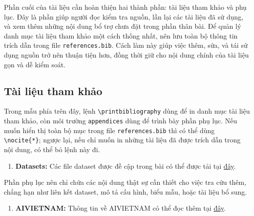\documentclass[12pt]{eDA_conquer2026}
\begin{document}
Phần cuối của tài liệu cần hoàn thiện hai thành phần: tài liệu tham khảo và phụ lục. Đây là phần giúp người đọc kiểm tra nguồn, lần lại các tài liệu đã sử dụng, và xem thêm những nội dung bổ trợ chưa đặt trong phần thân bài. Để quản lý danh mục tài liệu tham khảo một cách thống nhất, nên lưu toàn bộ thông tin trích dẫn trong file \texttt{references.bib}. Cách làm này giúp việc thêm, sửa, và tái sử dụng nguồn trở nên thuận tiện hơn, đồng thời giữ cho nội dung chính của tài liệu gọn và dễ kiểm soát.

\begin{aivnoutputbox}[]
\section{Tài liệu tham khảo}
\nocite{*}
\printbibliography
\end{aivnoutputbox}

Trong mẫu phía trên đây, lệnh \verb|\printbibliography| dùng để in danh mục tài liệu tham khảo, còn môi trường \verb|appendices| dùng để trình bày phần phụ lục. Nếu muốn hiển thị toàn bộ mục trong file \texttt{references.bib} thì có thể dùng \verb|\nocite{*}|; ngược lại, nếu chỉ muốn in những tài liệu đã được trích dẫn trong nội dung, có thể bỏ lệnh này đi. 

\begin{aivnoutputbox}
\begin{appendices}
\begin{enumerate}
    \item \textbf{Datasets:} Các file dataset được đề cập trong bài có thể được tải tại \href{https://aivietnam.edu.vn/}{đây}.
\end{enumerate}
\end{appendices}
\end{aivnoutputbox}

Phần phụ lục nên chỉ chứa các nội dung thật sự cần thiết cho việc tra cứu thêm, chẳng hạn như liên kết dataset, mô tả cấu hình, biểu mẫu, hoặc tài liệu bổ sung.

\begin{aivnoutputbox}
\begin{appendices}
\begin{enumerate}
    \item \textbf{AIVIETNAM:} Thông tin về AIVIETNAM có thể đọc thêm tại \href{https://aivietnam.edu.vn/}{đây}.
\end{enumerate}
\end{appendices}
\end{aivnoutputbox}
\end{document}

